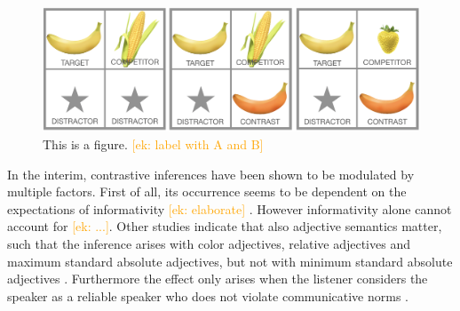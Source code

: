 \documentclass[10pt,letterpaper]{article}
\newcommand{\ek}[1]{\textcolor{Orange}{[ek: #1]}}
\begin{document}
\begin{figure}
	\begin{center}
		\includegraphics[width=.475\textwidth]{graphs/example-context.pdf}
	\end{center}
\caption{This is a figure. \ek{label with A and B}} 
\label{example-context}
\end{figure}





In the interim, contrastive inferences have been shown to be modulated by multiple factors. First of all, its occurrence seems to be dependent on the expectations of informativity \ek{elaborate} \cite{Aparicio:2016, Aparicio:2018, Sedivy:2003}. However informativity alone cannot account for \ek{...}. Other studies indicate that also adjective semantics matter, such that the inference arises with color adjectives, relative adjectives and maximum standard absolute
adjectives, but not with minimum standard absolute adjectives \cite{Aparicio:2018}. Furthermore the effect only arises when the listener considers the speaker as a reliable speaker who does not violate communicative norms \cite{Grodner:2011}.
\end{document}
